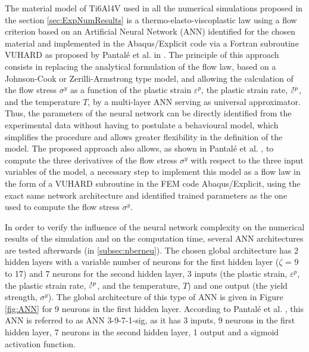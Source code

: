 \documentclass[preprint,12pt,times]{elsarticle}
\newcommand{\mdot}[1]{\accentset{\mbox{\bfseries .}}{#1}} %
\begin{document}
The material model of Ti6Al4V used in all the numerical simulations proposed in the section \ref{sec:ExpNumResults} is a thermo-elasto-viscoplastic law using a flow criterion based on an Artificial Neural Network (ANN) identified for the chosen material and implemented in the Abaqus/Explicit code via a Fortran subroutine VUHARD as proposed by Pantalé et al. in \cite{pantale_Efficient_2022}.
The principle of this approach consists in replacing the analytical formulation of the flow law, based on a Johnson-Cook or Zerilli-Armstrong type model, and allowing the calculation of the flow stress $\sigma^y$ as a function of the plastic strain $\varepsilon^p$, the plastic strain rate, $\mdot{\varepsilon}^p$, and the temperature $T$, by a multi-layer ANN serving as universal approximator. Thus, the parameters of the neural network can be directly identified from the experimental data without having to postulate a behavioural model, which simplifies the procedure and allows greater flexibility in the definition of the model.
The proposed approach also allows, as shown in Pantalé et al. \cite{pantale_Efficient_2022}, to compute the three derivatives of the flow stress $\sigma^y$ with respect to the three input variables of the model, a necessary step to implement this model as a flow law in the form of a VUHARD subroutine in the FEM code Abaqus/Explicit, using the exact same network architecture and identified trained parameters as the one used to compute the flow stress $\sigma^y$.

In order to verify the influence of the neural network complexity on the numerical results of the simulation and on the computation time, several ANN architectures are tested afterwards (in \ref{subsec:nberneu}). The chosen global architecture has 2 hidden layers with a variable number of neurons for the first hidden layer ($\zeta$ = 9 to 17) and 7 neurons for the second hidden layer, 3 inputs (the plastic strain, $\varepsilon^p$, the plastic strain rate, $\mdot{\varepsilon}^p$, and the temperature, $T$) and one output (the yield strength, $\sigma^y$). The global architecture of this type of ANN is given in Figure \ref{fig:ANN} for 9 neurons in the first hidden layer. According to Pantalé et al. \cite{pantale_Efficient_2022}, this ANN is referred to as ANN 3-9-7-1-sig, as it has 3 inputs, 9 neurons in the first hidden layer, 7 neurons in the second hidden layer, 1 output and a sigmoid activation function.
\end{document}
